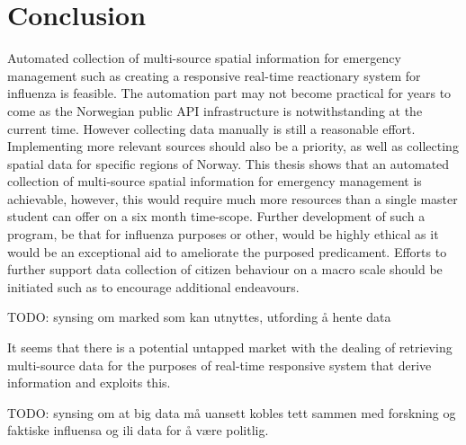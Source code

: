 \section{Conclusion}
Automated collection of multi-source spatial information for emergency management such as creating a responsive real-time reactionary system for influenza is feasible.
The automation part may not become practical for years to come as the Norwegian public API infrastructure is notwithstanding at the current time. However collecting data manually is still a reasonable effort. Implementing more relevant sources should also be a priority, as well as collecting spatial data for specific regions of Norway. 
This thesis shows that an automated collection of multi-source spatial information for emergency management is achievable, however, this would require much more resources than a single master student can offer on a six month time-scope. Further development of such a program, be that for influenza purposes or other, would be highly ethical as it would be an exceptional aid to ameliorate the purposed predicament. Efforts to further support data collection of citizen behaviour on a macro scale should be initiated such as to encourage additional endeavours.



TODO: synsing om marked som kan utnyttes, utfording å hente data

It seems that there is a potential untapped market with the dealing of retrieving multi-source data for the purposes of real-time responsive system that derive information and exploits this.


TODO: synsing om at big data må uansett kobles tett sammen med forskning og faktiske influensa og ili data for å være politlig.





































